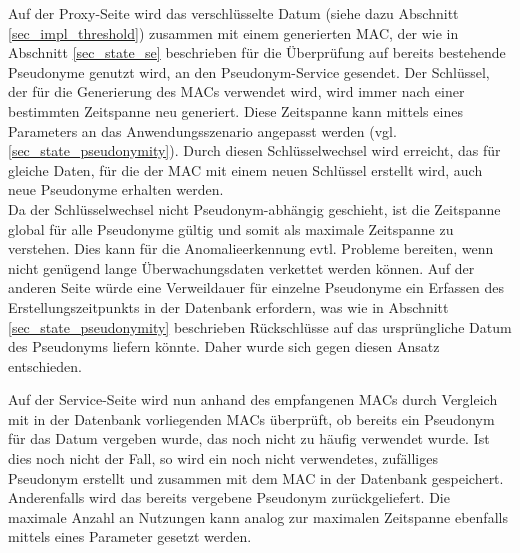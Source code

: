 Auf der Proxy-Seite wird das verschlüsselte Datum (siehe dazu Abschnitt \ref{sec_impl_threshold}) zusammen mit einem generierten MAC, der wie in Abschnitt \ref{sec_state_se} beschrieben für die Überprüfung auf bereits bestehende Pseudonyme genutzt wird, an den Pseudonym-Service gesendet. 
Der Schlüssel, der für die Generierung des MACs verwendet wird, wird immer nach einer bestimmten Zeitspanne neu generiert. Diese Zeitspanne kann mittels eines Parameters an das Anwendungsszenario angepasst werden (vgl. \ref{sec_state_pseudonymity}). Durch diesen Schlüsselwechsel wird erreicht, das für gleiche Daten, für die der MAC mit einem neuen Schlüssel erstellt wird, auch neue Pseudonyme erhalten werden. \\
Da der Schlüsselwechsel nicht Pseudonym-abhängig geschieht, ist die Zeitspanne global für alle Pseudonyme gültig und somit als maximale Zeitspanne zu verstehen. Dies kann für die Anomalieerkennung evtl. Probleme bereiten, wenn nicht genügend lange Überwachungsdaten verkettet werden können. Auf der anderen Seite würde eine Verweildauer für einzelne Pseudonyme ein Erfassen des Erstellungszeitpunkts in der Datenbank erfordern, was wie in Abschnitt \ref{sec_state_pseudonymity} beschrieben Rückschlüsse auf das ursprüngliche Datum des Pseudonyms liefern könnte. Daher wurde sich gegen diesen Ansatz entschieden.

Auf der Service-Seite wird nun anhand des empfangenen MACs durch Vergleich mit in der Datenbank vorliegenden MACs überprüft, ob bereits ein Pseudonym für das Datum vergeben wurde, das noch nicht zu häufig verwendet wurde. Ist dies noch nicht der Fall, so wird ein noch nicht verwendetes, zufälliges Pseudonym erstellt und zusammen mit dem MAC in der Datenbank gespeichert. Anderenfalls wird das bereits vergebene Pseudonym zurückgeliefert. Die maximale Anzahl an Nutzungen kann analog zur maximalen Zeitspanne ebenfalls mittels eines Parameter gesetzt werden. 


